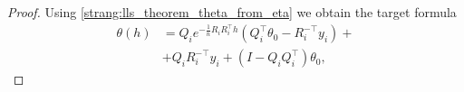 \documentclass{article}
\begin{document}
\begin{proof}
Using \eqref{strang:lls_theorem_theta_from_eta} we obtain the target formula
\begin{equation*}
\begin{split}
\theta(h) &= Q_i e^{-\frac{1}{n}R_iR_i^\top h} \left( Q_i^\top \theta_0 - R_i^{-\top}y_i\right) + \\ &+ Q_iR_i^{-\top}y_i + (I - Q_iQ_i^\top)\theta_0,
\end{split}
\end{equation*}

\end{proof}

\end{document}
